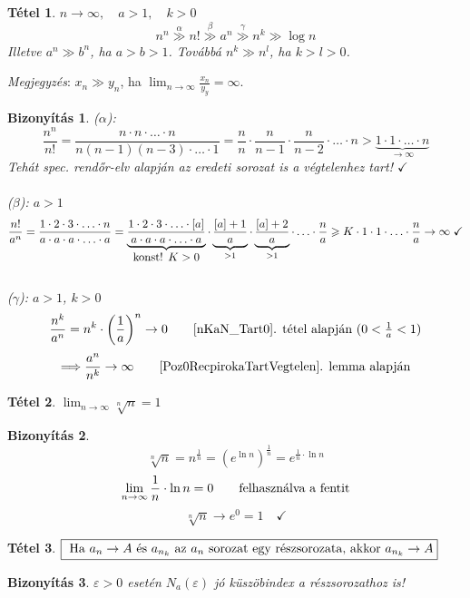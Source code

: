 \documentclass[a4paper,12pt,twoside]{book}
\newtheorem{tetel}{Tétel}[chapter]
\theoremstyle{break}
\newtheorem{biz}{Bizonyítás}[chapter]
\newtheorem{bizNL}[biz]{Bizonyítás}
\theoremstyle{plain}
\begin{document}
\begin{tetel}\label{Nagysagrendek} $n\to\infty, \quad a>1, \quad k>0$
\[\boxed{ n^n \overset{\alpha}{\gg} n! \overset{\beta}{\gg} a^n \overset{\gamma}{\gg} n^k \gg \log n }\]
Illetve $a^n \gg b^n$, ha $a>b>1$. Továbbá $n^k \gg n^l$, ha $k>l>0$.
\end{tetel}
\textit{Megjegyzés}: $x_n \gg y_n$, ha $\displaystyle \lim_{n\to\infty} \frac{x_n}{y_y} = \infty$.
\begin{bizNL}
($\alpha$):
\[\frac{n^n}{n!} = \frac{n\cdot n\cdot \ldots \cdot n}{n(n-1)(n-3)\cdot\ldots\cdot 1} = \frac{n}{n}\cdot\frac{n}{n-1}\cdot\frac{n}{n-2}\cdot\ldots\cdot n > \underbrace{1\cdot 1\cdot \ldots \cdot n}_{\to\infty}\]
Tehát spec. rendőr-elv alapján az eredeti sorozat is a végtelenhez tart! $\checkmark$\\
\\
($\beta$): $a>1$
\[\frac{n!}{a^n}=\frac{1\cdot 2\cdot 3\cdot\ldots\cdot n}{a\cdot a\cdot a\cdot \ldots \cdot a} = \underbrace{\frac{1\cdot 2\cdot 3\cdot\ldots\cdot [a]}{a\cdot a\cdot a\cdot \ldots \cdot a}}_{\hbox{konst! $K>0$}}\cdot\underbrace{\frac{[a]+1}{a}}_{>1}\cdot\underbrace{\frac{[a]+2}{a}}_{>1}\cdot\ldots\cdot\frac{n}{a} \geqslant K\cdot 1\cdot 1\cdot\ldots\cdot \frac{n}{a} \to \infty \; \checkmark\]\\
($\gamma$): $a>1$, $k>0$
\[\frac{n^k}{a^n}=n^k\cdot\left(\frac{1}{a}\right)^n\to 0 \qquad \hbox{\ref{nKaN_Tart0}. tétel alapján ($0<\frac{1}{a}<1$)}\]
\[\Longrightarrow \frac{a^n}{n^k}\to\infty \qquad \hbox{\ref{Poz0RecpirokaTartVegtelen}. lemma alapján}\]
\end{bizNL}

\begin{tetel}$\displaystyle \boxed{\lim_{n\to\infty} \sqrt[n]{n}=1}$\end{tetel}
\begin{biz}
\[\sqrt[n]{n}=n^{\frac{1}{n}}=(e^{\ln n})^\frac{1}{n}=e^{\frac{1}{n}\cdot\ln n}\]
\[\lim_{n\to\infty} \frac{1}{n}\cdot\ln n = 0 \qquad \hbox{felhasználva a fentit}\]
\[\sqrt[n]{n} \to e^0 = 1 \quad \checkmark\]
\end{biz}

\begin{tetel} \label{ReszsorozatHatarerteke} $\boxed{$ Ha $a_n\to A$ és $a_{n_k}$ az $a_n$ sorozat egy részsorozata, akkor $a_{n_k}\to A}$ \end{tetel}
\begin{bizNL}
$\varepsilon>0$ esetén $N_a(\varepsilon)$ jó küszöbindex a részsorozathoz is!
\end{bizNL}
\end{document}
